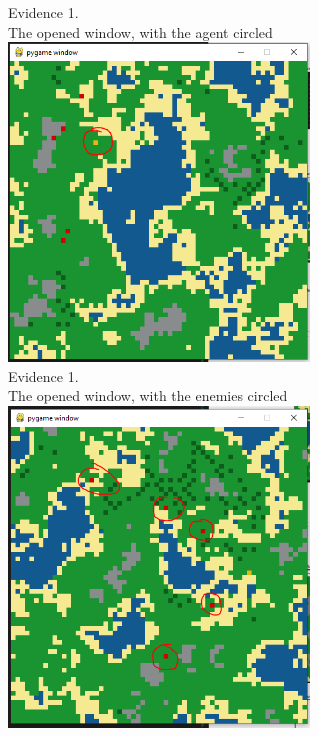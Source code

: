 \begin{flushleft}
\begin{center}
        {\large Evidence 1.\rn } \\ 
        \vspace{0.3cm}
        The opened window, with the agent circled \\
        \includegraphics[width=8cm]{Images/Testing/T1.8.1.PNG} \\

        {\large Evidence 1.\rn } \\ 
        \vspace{0.3cm}
        The opened window, with the enemies circled \\
        \includegraphics[width=8cm]{Images/Testing/T1.9.1.PNG} \\


\end{center}
\end{flushleft}

